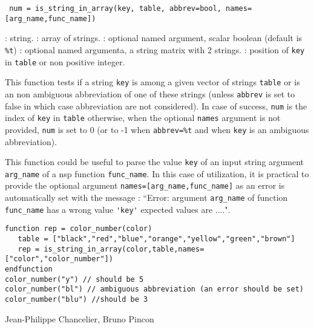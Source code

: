 
\begin{mandesc}
\end{mandesc}
\begin{calling_sequence}
\begin{verbatim}
 num = is_string_in_array(key, table, abbrev=bool, names=[arg_name,func_name])  
\end{verbatim}
\end{calling_sequence}
\begin{parameters}
  \begin{varlist}
    : string.
    : array of strings.
    : optional named argument, scalar boolean (default is \verb+%t+)
    : optional named argumenta, a string matrix with 2 strings.
    : position of \verb+key+ in \verb+table+ or non positive integer.
  \end{varlist}
\end{parameters}
\begin{mandescription}
  This function tests if a string \verb+key+ is among a given vector of strings \verb+table+
 or is an non ambiguous abbreviation of one of these strings (unless \verb+abbrev+ 
 is set to false in which case abbreviation are not considered). In case of success, 
 \verb+num+ is the index of \verb+key+ in  \verb+table+ otherwise, when the optional
 \verb+names+ argument is not provided, \verb+num+ is set to 0 
 (or to -1 when \verb+abbrev=%t+ and when \verb+key+ is an ambiguous abbreviation).
 
  This function could be useful to parse the value \verb+key+ of an input string argument 
 \verb+arg_name+ of a nsp function  \verb+func_name+. In this case of utilization, it is
 practical to provide the optional argument \verb+names=[arg_name,func_name]+ as an error 
 is automatically set with the message : ``Error:  argument \verb+arg_name+ of function  
\verb+func_name+  has a wrong value \verb+'key'+ expected values are ....".

\end{mandescription}
\begin{examples}
\begin{Verbatim}
function rep = color_number(color)
   table = ["black","red","blue","orange","yellow","green","brown"]
   rep = is_string_in_array(color,table,names=["color","color_number"])
endfunction
color_number("y") // should be 5
color_number("bl") // ambiguous abbreviation (an error should be set)
color_number("blu") //should be 3
\end{Verbatim}
\end{examples}

\begin{manseealso}
\end{manseealso}

\begin{authors}
  Jean-Philippe Chancelier, Bruno Pincon
\end{authors}


